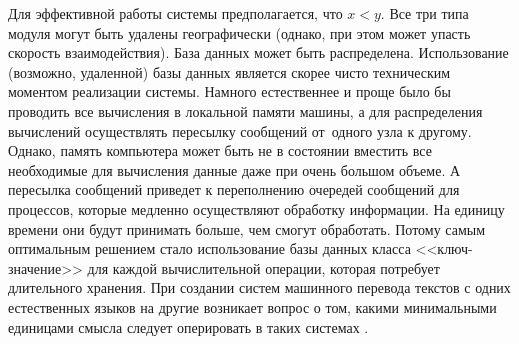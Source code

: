 \begin{figured}
\end{figured}

Для эффективной работы системы предполагается, что $x < y$.
Все три типа модуля могут быть удалены географически (однако, при этом может упасть 
скорость взаимодействия). База данных может быть распределена.
Использование (возможно, удаленной) базы данных является
скорее чисто техническим моментом реализации системы. 
Намного естественнее и проще было бы проводить все вычисления в локальной памяти 
машины, а для распределения вычислений осуществлять пересылку сообщений 
от~одного узла к другому. Однако, память компьютера может быть не в состоянии
вместить все необходимые для вычисления данные даже при очень большом объеме.
А пересылка сообщений приведет к переполнению очередей сообщений для процессов,
которые медленно осуществляют обработку информации. 
На единицу времени они будут принимать больше, чем смогут обработать.
Потому самым оптимальным решением стало использование 
базы данных класса <<ключ-значение>> для каждой вычислительной 
операции, которая потребует длительного хранения.
При создании систем машинного перевода текстов с одних
естественных языков на другие возникает вопрос о том, какими
минимальными единицами смысла следует оперировать в таких
системах \cite{Хорошилов:2006}. 

